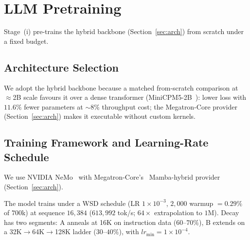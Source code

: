 \section{LLM Pretraining}\label{sec:llm-pretrain}

Stage~(i) pre-trains the hybrid backbone (Section~\ref{sec:arch}) from scratch under a fixed budget.

\subsection{Architecture Selection}\label{sec:arch-rationale}
We adopt the hybrid backbone because a matched from-scratch comparison at $\approx$2B scale favours it over a dense transformer (MiniCPM5-2B~\cite{openbmb2026minicpm5}): lower loss with $11.6\%$ fewer parameters at $\sim$8\% throughput cost; the Megatron-Core provider (Section~\ref{sec:arch}) makes it executable without custom kernels.

\subsection{Training Framework and Learning-Rate Schedule}\label{sec:framework}
We use NVIDIA NeMo~\cite{nvidia-nemo} with Megatron-Core's~\cite{nvidia-megatron} Mamba-hybrid provider (Section~\ref{sec:arch}).

The model trains under a WSD schedule (LR $1\times10^{-3}$, $2{,}000$ warmup $=0.29\%$ of $700$k) at sequence $16{,}384$ ($613{,}992$ tok/s; $64\times$ extrapolation to $1$M). Decay has two segments: A anneals at 16K on instruction data ($60$--$70\%$), B extends on a \mbox{32K$\to$64K$\to$128K} ladder ($30$--$40\%$), with $lr_{\min}{=}1\times10^{-4}$.

